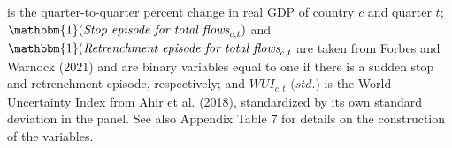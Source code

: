 \documentclass[12pt,oneside,leqno]{article}
\begin{document}
\begin{table}[!h]
{\begin{threeparttable}
\begin{tablenotes}[flushleft]
is the quarter-to-quarter percent change in real GDP of country $c$ and quarter $t$; $\mathbbm{1}(\textit{Stop episode for total flows}_{c,t})$ and $\mathbbm{1}(\textit{Retrenchment episode for total flows}_{c,t}$ are taken from Forbes and Warnock (2021) and are binary variables equal to one if there is a sudden stop and retrenchment episode, respectively; and $\textit{WUI}_{c,t}\textit{ (std.)}$ is the World Uncertainty Index from Ahir et al. (2018), standardized by its own standard deviation in the panel. See also Appendix Table 7 for details on the construction of the variables.
\end{tablenotes}
\end{threeparttable}
}
\end{table}


\clearpage

\begin{table}[!h]
\caption{Country Risk, Country Sentiment, and asset prices}\centering \label{tab:validation}
\end{table}
\end{document}
